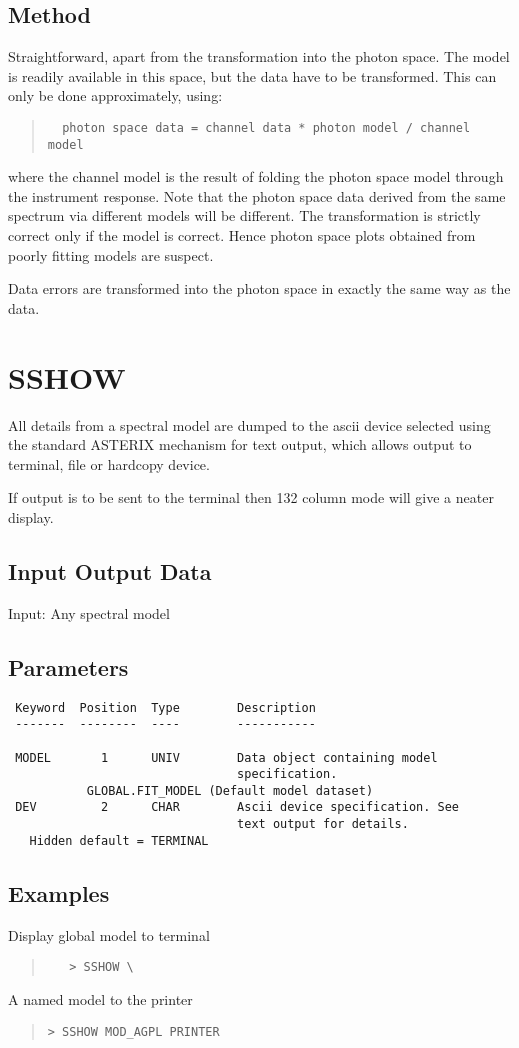 \documentclass{book}
\renewcommand{\_}{{\tt\char'137}}     %
\begin{document}
\subsection{Method}
Straightforward, apart from the transformation into the photon
space. The model is readily available in this space, but the data
have to be transformed. This can only be done approximately,
using:
\begin{quote}\begin{verbatim}
  photon space data = channel data * photon model / channel model
\end{verbatim}\end{quote}
where the channel model is the result of folding the photon space
model through the instrument response. Note that the photon space
data derived from the same spectrum via different models will be
different. The transformation is strictly correct only if the
model is correct. Hence photon space plots obtained from poorly
fitting models are suspect.

Data errors are transformed into the photon space in exactly the
same way as the data.

\section{SSHOW}
All details from a spectral model are dumped to the ascii
device selected using the standard ASTERIX mechanism for
text output, which allows output to terminal, file or
hardcopy device.

If output is to be sent to the terminal then 132 column
mode will give a neater display.

\subsection{Input Output Data}
Input: Any spectral model
\subsection{Parameters}
\begin{verbatim}
 Keyword  Position  Type        Description
 -------  --------  ----        -----------

 MODEL       1      UNIV        Data object containing model
                                specification.
           GLOBAL.FIT_MODEL (Default model dataset)
 DEV         2      CHAR        Ascii device specification. See
                                text output for details.
   Hidden default = TERMINAL
\end{verbatim}\subsection{Examples}
Display global model to terminal
\begin{quote}\begin{verbatim}
   > SSHOW \
\end{verbatim}\end{quote}
A named model to the printer
\begin{quote}\begin{verbatim}
> SSHOW MOD_AGPL PRINTER
\end{verbatim}\end{quote}
\end{document}
